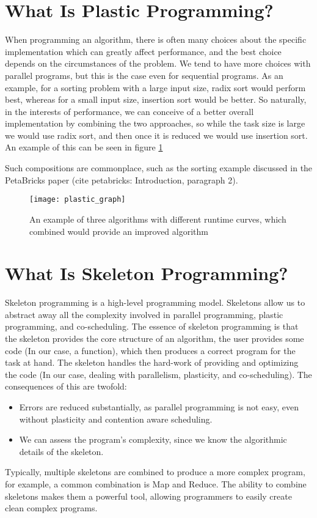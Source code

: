 \section{What Is Plastic Programming?}

When programming an algorithm, there is often many choices about the specific implementation which can greatly affect performance, and the best choice depends on the circumstances of the problem. We tend to have more choices with parallel programs, but this is the case even for sequential programs. As an example, for a sorting problem with a large input size, radix sort would perform best, whereas for a small input size, insertion sort would be better. So naturally, in the interests of performance, we can conceive of a better overall implementation by combining the two approaches, so while the task size is large we would use radix sort, and then once it is reduced we would use insertion sort. An example of this can be seen in figure \ref{fig:plastic_graph}

Such compositions are commonplace, such as the sorting example discussed in the PetaBricks paper (cite petabricks: Introduction, paragraph 2).



\begin{figure}
	\texttt{[image: plastic\_graph]}
	\caption{An example of three algorithms with different runtime curves, which combined would provide an improved algorithm}
	\label{fig:plastic_graph}
\end{figure}



\section{What Is Skeleton Programming?}

Skeleton programming is a high-level programming model. Skeletons allow us to abstract away all the complexity involved in parallel programming, plastic programming, and co-scheduling. The essence of skeleton programming is that the skeleton provides the core structure of an algorithm, the user provides some code (In our case, a function), which then produces a correct program for the task at hand. The skeleton handles the hard-work of providing and optimizing the code (In our case, dealing with parallelism, plasticity, and co-scheduling). The consequences of this are twofold:

\begin{itemize}
	\item Errors are reduced substantially, as parallel programming is not easy, even without plasticity and contention aware scheduling.
	\item We can assess the program's complexity, since we know the algorithmic details of the skeleton.
\end{itemize}

Typically, multiple skeletons are combined to produce a more complex program, for example, a common combination is Map and Reduce. The ability to combine skeletons makes them a powerful tool, allowing programmers to easily create clean complex programs.